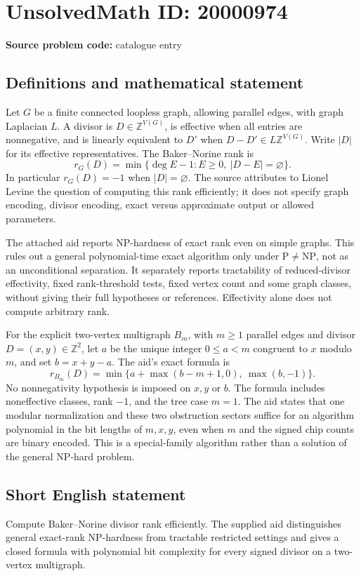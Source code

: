\documentclass[11pt]{article}
\newcommand{\Z}{\mathbb{Z}}
\begin{document}
\section*{UnsolvedMath ID: 20000974}
\textbf{Source problem code:} catalogue entry
\subsection{Definitions and mathematical statement}
Let $G$ be a finite connected loopless graph, allowing parallel edges, with graph Laplacian $L$. A divisor is $D\in\Z^{V(G)}$, is effective when all entries are nonnegative, and is linearly equivalent to $D'$ when $D-D'\in L\Z^{V(G)}$. Write $|D|$ for its effective representatives. The Baker--Norine rank is
\[
r_G(D)=\min\{\deg E-1:E\ge0,\ |D-E|=\varnothing\}.
\]
In particular $r_G(D)=-1$ when $|D|=\varnothing$. The source attributes to Lionel Levine the question of computing this rank efficiently; it does not specify graph encoding, divisor encoding, exact versus approximate output or allowed parameters.

The attached aid reports NP-hardness of exact rank even on simple graphs. This rules out a general polynomial-time exact algorithm only under $\mathrm P\ne\mathrm{NP}$, not as an unconditional separation. It separately reports tractability of reduced-divisor effectivity, fixed rank-threshold tests, fixed vertex count and some graph classes, without giving their full hypotheses or references. Effectivity alone does not compute arbitrary rank.

For the explicit two-vertex multigraph $B_m$, with $m\ge1$ parallel edges and divisor $D=(x,y)\in\Z^2$, let $a$ be the unique integer $0\le a<m$ congruent to $x$ modulo $m$, and set $b=x+y-a$. The aid's exact formula is
\[
r_{B_m}(D)=\min\{a+\max(b-m+1,0),\ \max(b,-1)\}.
\]
No nonnegativity hypothesis is imposed on $x,y$ or $b$. The formula includes noneffective classes, rank $-1$, and the tree case $m=1$. The aid states that one modular normalization and these two obstruction sectors suffice for an algorithm polynomial in the bit lengths of $m,x,y$, even when $m$ and the signed chip counts are binary encoded. This is a special-family algorithm rather than a solution of the general NP-hard problem.
\subsection{Short English statement}
Compute Baker--Norine divisor rank efficiently. The supplied aid distinguishes general exact-rank NP-hardness from tractable restricted settings and gives a closed formula with polynomial bit complexity for every signed divisor on a two-vertex multigraph.
\end{document}
